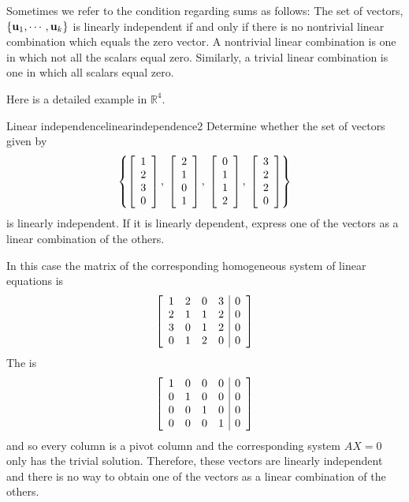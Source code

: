 Sometimes we refer to the condition regarding sums as follows: The set
of vectors, $\left\{ {\bf u}_{1},\cdots ,{\bf u}_{k}\right\} $ is
linearly independent if and only if there is no nontrivial linear
combination which equals the zero vector. A nontrivial linear
combination is one in which not all the scalars equal zero. Similarly,
a trivial linear combination is one in which all scalars equal zero.

Here is a detailed  example in  $\mathbb{R}^{4}$. 

\begin{example}{Linear independence}{linearindependence2}
Determine whether the set of vectors given by  
\[ \left\{ \left[
\begin{array}{r}
1 \\
2 \\
3 \\
0
\end{array}
\right], \; \left[
\begin{array}{r}
2 \\
1 \\
0 \\
1
\end{array}
\right] , \; \left[
\begin{array}{r}
0 \\
1 \\
1 \\
2
\end{array}
\right]  , \; \left[
\begin{array}{r}
3 \\
2 \\
2 \\
0
\end{array}
\right] \right\} \]
is linearly independent. If it is linearly dependent,
express one of the vectors as a linear combination of the others.
\end{example}

\begin{solution}
In this case the matrix of the corresponding homogeneous system of linear equations  is 
\begin{equation*}
\left[ 
\begin{array}{rrrr|r}
1 & 2 & 0 & 3 & 0\\ 
2 & 1 & 1 & 2 & 0 \\ 
3 & 0 & 1 & 2 & 0 \\ 
0 & 1 & 2 & 0 & 0 
\end{array}
\right]
\end{equation*}
The {\rref} is 
\begin{equation*}
\left[ 
\begin{array}{rrrr|r}
1 & 0 & 0 & 0 & 0 \\ 
0 & 1 & 0 & 0 & 0 \\ 
0 & 0 & 1 & 0 & 0 \\ 
0 & 0 & 0 & 1 & 0 
\end{array}
\right]
\end{equation*}
and so every column is a pivot column and the corresponding system
$AX=0$ only has the trivial solution.  Therefore, these vectors are
linearly independent and there is no way to obtain one of the vectors
as a linear combination of the others.
\end{solution}

